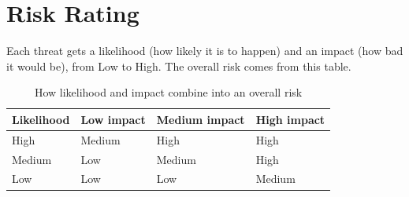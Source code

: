 \documentclass[11pt]{article}
\begin{document}
\section{Risk Rating}
Each threat gets a likelihood (how likely it is to happen) and an impact (how bad it would be), from Low to High. The overall risk comes from this table.
\begin{table}[H]
\caption{How likelihood and impact combine into an overall risk}
\begin{tabular}{|m{}|m{}|m{}|m{}|}
\hline
\textbf{Likelihood} & \textbf{Low impact} & \textbf{Medium impact} & \textbf{High impact} \\
\hline
High & Medium & High & High \\
\hline
Medium & Low & Medium & High \\
\hline
Low & Low & Low & Medium
\end{tabular}
\end{table}
\end{document}
